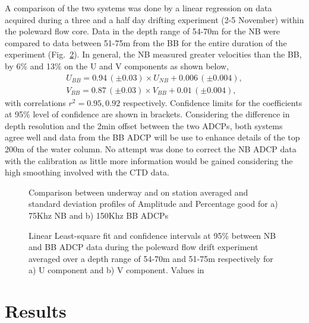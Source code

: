 A comparison of the two systems was done by a linear regression on
data acquired during a three and a half day drifting experiment
(2-5 November) within the poleward flow core. Data in the depth
range of 54-70m for the NB were compared to data between 51-75m
from the BB for the entire duration of the experiment
(Fig.~\ref{fig:wintercal}). In general, the NB measured greater
velocities than the BB, by 6\% and 13\% on the U and V components
as shown below,
\begin{eqnarray}
  U_{BB} = 0.94\,(\pm 0.03)\times U_{NB} + 0.006\,(\pm 0.004),\\
  \label{eq:adcpcorrU}
  V_{BB} = 0.87\,(\pm 0.03)\times V_{BB} + 0.01 \,(\pm 0.004),
  \label{eq:adcpcorrV}
\end{eqnarray}
with correlations $r^2=0.95,0.92$ respectively. Confidence limits
for the coefficients at 95\% level of confidence are shown in
brackets. Considering the difference in depth resolution and the
2min offset between the two ADCPs, both systems agree well and
data from the BB ADCP will be use to enhance details of the top
200m of the water column. No attempt was done to correct the NB
ADCP data with the calibration as little more information would be
gained considering the high smoothing involved with the CTD data.
\begin{figure}
\centering {}
\caption{Comparison between underway and on station averaged and
standard deviation profiles of Amplitude and Percentage good for
a) 75Khz NB and b) 150Khz BB ADCPs } \label{fig:winterquality}
\end{figure}

\begin{figure}
\centering {}
\caption{Linear Least-square fit and confidence intervals at 95\%
between NB and BB ADCP data during the poleward flow drift
experiment averaged over a depth range of 54-70m and 51-75m
respectively for a) U component and b) V component. Values in
\vel} \label{fig:wintercal}
\end{figure}


\section{Results}
